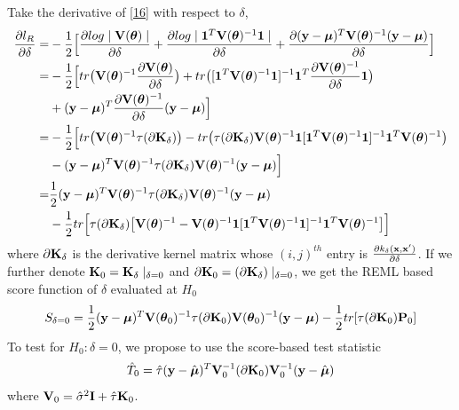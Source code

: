 \documentclass[11pt]{article}
\begin{document}
Take the derivative of \eqref{16} with respect to $\delta$,
\begin{align}
\frac{\partial l_R}{\partial \delta}=&-\frac{1}{2}\Big[\frac{\partial log\mid {\bf V}(\boldsymbol{\theta}) \mid}{\partial \delta}+\frac{\partial log \mid \mathbf{1}^T{\bf V}(\boldsymbol{\theta})^{-1}\mathbf{1} \mid}{\partial \delta}+ \frac{\partial ({\bf y}-\boldsymbol{\mu})^T{\bf V}(\boldsymbol{\theta})^{-1}({\bf y}-\boldsymbol{\mu})}{\partial \delta}\Big]\nonumber \\
=&-\frac{1}{2}\Big[tr\big({\bf V}(\boldsymbol{\theta})^{-1}\frac{\partial {\bf V}(\boldsymbol{\theta})}{\partial \delta}\big)+tr\big([\mathbf{1}^T{\bf V}(\boldsymbol{\theta})^{-1}\mathbf{1}]^{-1}\mathbf{1}^T\frac{\partial {\bf V}(\boldsymbol{\theta})^{-1}}{\partial \delta}\mathbf{1}\big)\nonumber \\
&+({\bf y}-\boldsymbol{\mu})^T\frac{\partial {\bf V}(\boldsymbol{\theta})^{-1}}{\partial \delta}({\bf y}-\boldsymbol{\mu}) \Big]\nonumber \\
=&-\frac{1}{2}\Big[tr\big({\bf V}(\boldsymbol{\theta})^{-1}\tau (\partial {\bf K}_\delta)\big)-tr\big(\tau (\partial {\bf K}_\delta){\bf V}(\boldsymbol{\theta})^{-1}\mathbf{1}[\mathbf{1}^T{\bf V}(\boldsymbol{\theta})^{-1}\mathbf{1}]^{-1}\mathbf{1}^T{\bf V}(\boldsymbol{\theta})^{-1}\big)\nonumber \\
&-({\bf y}-\boldsymbol{\mu})^T{\bf V}(\boldsymbol{\theta})^{-1}\tau (\partial {\bf K}_\delta){\bf V}(\boldsymbol{\theta})^{-1}({\bf y}-\boldsymbol{\mu}) \Big]\nonumber \\
=&\frac{1}{2}({\bf y}-\boldsymbol{\mu})^T{\bf V}(\boldsymbol{\theta})^{-1}\tau (\partial {\bf K}_\delta){\bf V}(\boldsymbol{\theta})^{-1}({\bf y}-\boldsymbol{\mu})\nonumber \\
&-\frac{1}{2}tr\Big[\tau (\partial {\bf K}_\delta)\big[{\bf V}(\boldsymbol{\theta})^{-1}-{\bf V}(\boldsymbol{\theta})^{-1}\mathbf{1}[\mathbf{1}^T{\bf V}(\boldsymbol{\theta})^{-1}\mathbf{1} ]^{-1}\mathbf{1}^T{\bf V}(\boldsymbol{\theta})^{-1}\big]\Big] \label{17}
\end{align}
where $\partial {\bf K}_\delta$ is the derivative kernel matrix whose $(i,j)^{th}$ entry is $\frac{\partial k_\delta({\bf x}, {\bf x}')}{\partial \delta}$. If we further denote ${\bf K}_0={\bf K}_\delta \mid_{\delta=0}$ and $\partial {\bf K}_0=(\partial {\bf K}_\delta)\mid_{\delta=0}$, we get the REML based score function of $\delta$ evaluated at $H_0$
\begin{align*}
S_{\delta=0}=\frac{1}{2}({\bf y}-\boldsymbol{\mu})^T{\bf V}(\boldsymbol{\theta}_0)^{-1}\tau (\partial {\bf K}_0){\bf V}(\boldsymbol{\theta}_0)^{-1}({\bf y}-\boldsymbol{\mu})-\frac{1}{2}tr[\tau (\partial {\bf K}_0){\bf P}_0]
\end{align*}
To test for $H_0: \delta=0$, we propose to use the score-based test statistic
\begin{align}
\hat{T}_0=\hat{\tau}({\bf y}-\hat{\boldsymbol{\mu}})^T{\bf V}_0^{-1} (\partial {\bf K}_0){\bf V}_0^{-1}({\bf y}-\hat{\boldsymbol{\mu}})
\end{align}
where ${\bf V}_0=\hat{\sigma}^2{\bf I}+\hat{\tau}{\bf K}_0$.
\end{document}
